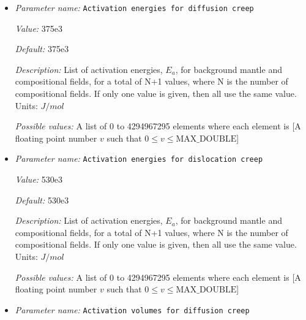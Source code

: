\begin{itemize}
\item {\it Parameter name:} {\tt Activation energies for diffusion creep}
\label{parameters:Material model/Diffusion dislocation/Activation energies for diffusion creep}
\label{parameters:Material_20model/Diffusion_20dislocation/Activation_20energies_20for_20diffusion_20creep}


{\it Value:} 375e3


{\it Default:} 375e3


{\it Description:} List of activation energies, $E_a$, for background mantle and compositional fields, for a total of N+1 values, where N is the number of compositional fields. If only one value is given, then all use the same value.  Units: $J / mol$


{\it Possible values:} A list of 0 to 4294967295 elements where each element is [A floating point number $v$ such that $0 \leq v \leq \text{MAX\_DOUBLE}$]
\item {\it Parameter name:} {\tt Activation energies for dislocation creep}
\label{parameters:Material model/Diffusion dislocation/Activation energies for dislocation creep}
\label{parameters:Material_20model/Diffusion_20dislocation/Activation_20energies_20for_20dislocation_20creep}


{\it Value:} 530e3


{\it Default:} 530e3


{\it Description:} List of activation energies, $E_a$, for background mantle and compositional fields, for a total of N+1 values, where N is the number of compositional fields. If only one value is given, then all use the same value.  Units: $J / mol$


{\it Possible values:} A list of 0 to 4294967295 elements where each element is [A floating point number $v$ such that $0 \leq v \leq \text{MAX\_DOUBLE}$]
\item {\it Parameter name:} {\tt Activation volumes for diffusion creep}
\label{parameters:Material model/Diffusion dislocation/Activation volumes for diffusion creep}
\label{parameters:Material_20model/Diffusion_20dislocation/Activation_20volumes_20for_20diffusion_20creep}



\end{itemize}
